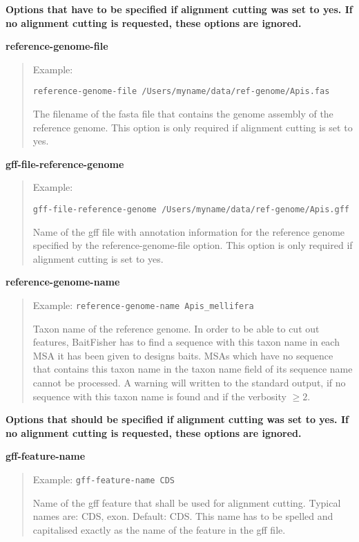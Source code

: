 \documentclass[a4paper,pdflatex,11pt]{article}
\begin{document}
\textbf{Options that have to be specified if alignment cutting was set
to yes. If no alignment cutting is requested, these options are
ignored.}

\textbf{reference-genome-file}

\begin{quote}
Example:

\verb+reference-genome-file /Users/myname/data/ref-genome/Apis.fas+

The filename of the fasta file that contains the genome assembly of the
reference genome. This option is only required if alignment cutting is
set to yes.
\end{quote}

\textbf{gff-file-reference-genome}

\begin{quote}
Example:

\verb+gff-file-reference-genome /Users/myname/data/ref-genome/Apis.gff+

Name of the gff file with annotation information for the reference
genome specified by the reference-genome-file option. This option is
only required if alignment cutting is set to yes.
\end{quote}

\textbf{reference-genome-name}

\begin{quote}
Example: \verb+reference-genome-name Apis_mellifera+

Taxon name of the reference genome. In order to be able to cut out
features, BaitFisher has to find a sequence with this taxon name in each
MSA it has been given to designs baits. MSAs which have no sequence that
contains this taxon name in the taxon name field of its sequence name
cannot be processed. A warning will written to the standard output, if
no sequence with this taxon name is found and if the verbosity
$\ge 2$.
\end{quote}

\textbf{Options that should be specified if alignment cutting was set to
yes. If no alignment cutting is requested, these options are ignored.}

\textbf{gff-feature-name}

\begin{quote}
Example: \verb+gff-feature-name CDS+

Name of the gff feature that shall be used for alignment cutting.
Typical names are: CDS, exon. Default: CDS. This name has to be spelled
and capitalised exactly as the name of the feature in the gff file.
\end{quote}
\end{document}
